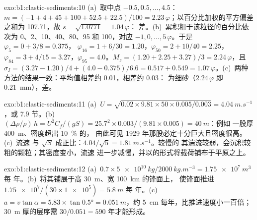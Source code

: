 \begin{solution}{exo:b1:clastic-sediments:10}
(a)~取中点 $-0.5, 0.5, \ldots, 4.5$：$m = (-1 + 4 + 45 + 100 + 52.5
+ 22.5)/100 = 2.23\,\varphi$；以百分比加权的平方偏差之和为
\num{107.71}，故 $s = \sqrt{1.0771} = 1.04\,\varphi$：
差。(b)~累积粗于该粒径的百分比依次为 0、2、10、40、80、95 和
100，对应 $-1, 0, \ldots, 5\,\varphi$。于是 $\varphi_5 = 0 + 3/8 = 0.375$，
$\varphi_{16} = 1 + 6/30 = 1.20$，$\varphi_{50} = 2 + 10/40 = 2.25$，
$\varphi_{84} = 3 + 4/15 = 3.27$，$\varphi_{95} = 4.0$。$M_z = (1.20 + 2.25 +
3.27)/3 = 2.24\,\varphi$，且 $\sigma_I = (3.27 - 1.20)/4 + (4.0 - 0.375)/6.6 =
0.517 + 0.549 = 1.07\,\varphi$。(c)~两种方法的结果一致：平均值相差约
\num{0.01}，相差约 \num{0.03}：
为细砂（$2.24\,\varphi$ 即 \qty{0.21}{mm}），差。
\end{solution}

\begin{solution}{exo:b1:clastic-sediments:11}
(a)~$U = \sqrt{0.02 \times 9.81 \times 50 \times 0.005/0.003} =
\qty{4.04}{m.s^{-1}}$，或 7.9 节。(b)~$(\Delta\rho/\rho)\,h = U^2
C_f/(gS) = 25.7^2 \times 0.003/(9.81 \times 0.005) = \qty{40}{m}$：例如
一股厚 \qty{400}{m}、密度超出 \qty{10}{\percent} 的，
由此可见 1929 年那股必定十分巨大且密度很高。(c)~流速
与 $\sqrt S$ 成正比：$4.04/\sqrt 5 = \qty{1.81}{m.s^{-1}}$。较慢的
其湍流较弱，会沉积较粗的颗粒；其密度变小，流速
进一步减慢，并以的形式将载荷铺布于平原之上。
\end{solution}

\begin{solution}{exo:b1:clastic-sediments:12}
(a)~$0.7 \times \qty{5e10}{kg}/\qty{2000}{kg.m^{-3}} = \qty{1.75e7}{m^3}$ 每
年。(b)~将其铺展于高 \qty{30}{m}、宽 \qty{100}{km} 的锋面上，
使锋面推进 $\num{1.75e7}/(30 \times \num{1e5}) = \qty{5.8}{m}$ 每
年。(c)~$a = v\tan\alpha = 5.83 \times \tan\ang{0.5} = \qty{0.051}{m}$，约
\qty{5}{cm} 每年，比推进速度小一百倍；
\qty{30}{m} 厚的层序需 $30/0.051 = 590$ 年才能形成。
\end{solution}

